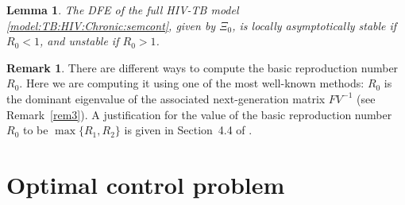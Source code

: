 \documentclass{my_aims}
\newtheorem{lemma}[theorem]{Lemma}
\theoremstyle{definition}
\newtheorem{remark}{Remark}
\begin{document}
\begin{lemma}
The DFE of the full HIV-TB model \eqref{model:TB:HIV:Chronic:semcont},
given by $\Xi_0$, is locally asymptotically stable
if $R_0 < 1$, and unstable if $R_0 > 1$.
\end{lemma}

\begin{remark}
There are different ways to compute the basic reproduction number $R_0$. Here we are computing it using
one of the most well-known methods: $R_0$ is the dominant eigenvalue of the associated
next-generation matrix $F V^{-1}$ (see Remark~\ref{rem3}). A justification for the value
of the basic reproduction number $R_0$ to be $\max \{R_1, R_2 \}$
is given in Section~4.4 of \cite{van:den:Driessche:2002}.
\end{remark}

\section{Optimal control problem}
\label{sec:optimal:control}
\end{document}
